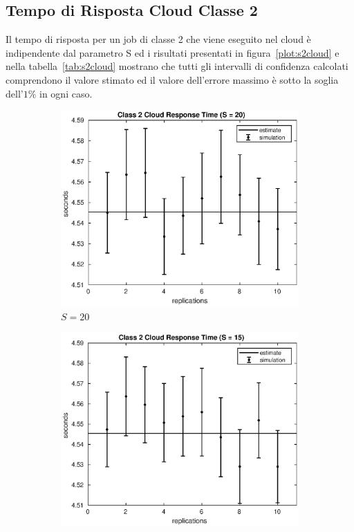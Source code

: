 \subsection{Tempo di Risposta Cloud Classe 2}
Il tempo di risposta per un job di classe 2 che viene eseguito nel cloud è
indipendente dal parametro S ed i risultati presentati in
figura~\ref{plot:s2cloud} e nella tabella~\ref{tab:s2cloud} mostrano che tutti
gli intervalli di confidenza calcolati comprendono il valore stimato ed il
valore dell'errore massimo è sotto la soglia dell'$1\%$ in ogni caso.
\begin{figure}[!h]
\centering
%
\begin{subfigure}[t]{0.49\textwidth}
\includegraphics[width=\textwidth]{figures/simul/20_500K_s2cloud}
\caption{$S = 20$}
\label{20_s2cloud}
\end{subfigure}
%
\begin{subfigure}[t]{0.49\textwidth}
\includegraphics[width=\textwidth]{figures/simul/15_500K_s2cloud}

\end{subfigure}
\end{figure}

